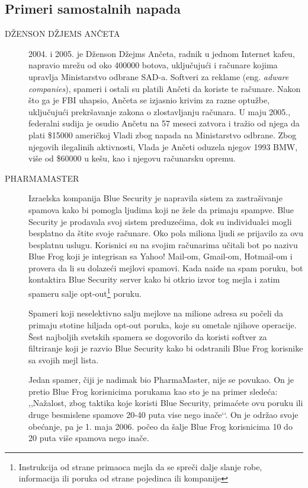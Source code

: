 \documentclass[a4paper]{article}
\theoremstyle{break}
\begin{document}
{\subsection{Primeri samostalnih napada}
\label{subsec:primeri_samo_napada}

\begin{description}
\item[DŽENSON DŽJEMS ANČETA] 2004. i 2005. je Dženson Džejms Ančeta, radnik u jednom Internet kafeu, napravio mrežu od oko 400000 botova, uključujući i računare kojima upravlja Ministarstvo odbrane SAD-a. Softveri za reklame (eng. {\em adware companies}), spameri i ostali su platili Ančeti da koriste te računare. Nakon što ga je FBI uhapsio, Ančeta se izjasnio krivim za razne optužbe, uključujući prekršavanje zakona o zlostavljanju računara. U maju 2005., federalni sudija je osudio Ančetu na 57 meseci zatvora i tražio od njega da plati \$15000 američkoj Vladi zbog napada na Ministarstvo odbrane. Zbog njegovih ilegalinih aktivnosti, Vlada je Ančeti oduzela njegov 1993 BMW, više od \$60000 u kešu, kao i njegovu računarsku opremu.

\item[PHARMAMASTER] Izraelska kompanija Blue Security je napravila sistem za zastrašivanje spamova kako bi pomogla ljudima koji ne žele da primaju spampve. Blue Security je prodavala svoj sistem preduzećima, dok su individualci mogli besplatno da štite svoje računare. Oko pola miliona ljudi se prijavilo za ovu besplatnu uslugu. Korisnici su na svojim računarima učitali bot po nazivu Blue Frog koji je integrisan sa Yahoo! Mail-om, Gmail-om, Hotmail-om i provera da li su dolazeći mejlovi spamovi. Kada naiđe na spam poruku, bot kontaktira Blue Security server kako bi otkrio izvor tog mejla i zatim spameru salje opt-out\footnote{Instrukcija od strane primaoca mejla da se spreči dalje slanje robe, informacija ili poruka od strane pojedinca ili kompanije} poruku.

Spameri koji neselektivno salju mejlove na milione adresa su počeli da primaju stotine hiljada opt-out poruka, koje su ometale njihove operacije. Šest najboljih svetskih spamera se dogovorilo da koristi softver za filtriranje koji je razvio Blue Security kako bi odstranili Blue Frog korisnike sa svojih mejl lista.

Jedan spamer, čiji je nadimak bio PharmaMaster, nije se povukao. On je pretio Blue Frog korisnicima porukama kao sto je na primer sledeća: ,,Nažalost, zbog taktika koje koristi Blue Security, primaćete ovu poruku ili druge besmislene spamove 20-40 puta vise nego inače‘‘. On je održao svoje obećanje, pa je 1. maja 2006. počeo da šalje Blue Frog korisnicima 10 do 20 puta više spamova nego inače.


\end{description}}
\end{document}

